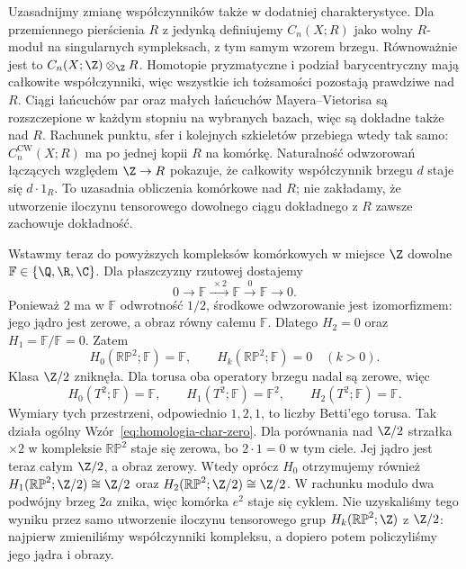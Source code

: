\begin{uwaga}
\label{rem:homologia-wspolczynniki-przestrzeni}
Uzasadnijmy zmianę współczynników także w dodatniej charakterystyce.
Dla przemiennego pierścienia $R$ z jedynką definiujemy $C_n(X;R)$
jako wolny $R$-moduł na singularnych sympleksach, z tym samym wzorem brzegu.
Równoważnie jest to $C_n(X;\Z)\otimes_{\Z}R$.
Homotopie pryzmatyczne i podział barycentryczny mają całkowite współczynniki,
więc wszystkie ich tożsamości pozostają prawdziwe nad $R$.
Ciągi łańcuchów par oraz małych łańcuchów Mayera--Vietorisa są
rozszczepione w każdym stopniu na wybranych bazach, więc są dokładne także nad $R$.
Rachunek punktu, sfer i kolejnych szkieletów przebiega wtedy tak samo:
$C_n^{\mathrm{CW}}(X;R)$ ma po jednej kopii $R$ na komórkę.
Naturalność odwzorowań łączących względem $\Z\to R$ pokazuje,
że całkowity współczynnik brzegu $d$ staje się $d\cdot1_R$.
To uzasadnia obliczenia komórkowe nad $R$; nie zakładamy,
że utworzenie iloczynu tensorowego dowolnego ciągu dokładnego
z $R$ zawsze zachowuje dokładność.
\end{uwaga}

\begin{przyklad}
\label{prz:zmiana-wspolczynnikow-rp2-torus}
Wstawmy teraz do powyższych kompleksów komórkowych
w miejsce $\Z$ dowolne
$\mathbb F\in\{\Q,\R,\C\}$.
Dla płaszczyzny rzutowej dostajemy
\[
 0\longrightarrow\mathbb F
 \xrightarrow{\;\times2\;}\mathbb F
 \xrightarrow{\;0\;}\mathbb F
 \longrightarrow0.
\]
Ponieważ $2$ ma w $\mathbb F$ odwrotność
$1/2$, środkowe odwzorowanie jest
izomorfizmem: jego jądro jest zerowe, a obraz równy całemu
$\mathbb F$. Dlatego $H_2=0$ oraz $H_1=\mathbb F/\mathbb F=0$.
Zatem
\[
 H_0(\mathbb{RP}^2;\mathbb F)=\mathbb F,
 \qquad H_k(\mathbb{RP}^2;\mathbb F)=0\quad(k>0).
\]
Klasa $\Z/2$ zniknęła. Dla torusa oba
operatory brzegu nadal są zerowe, więc
\[
 H_0(T^2;\mathbb F)=\mathbb F,\qquad
 H_1(T^2;\mathbb F)=\mathbb F^2,\qquad
 H_2(T^2;\mathbb F)=\mathbb F.
\]
Wymiary tych przestrzeni, odpowiednio
$1,2,1$, to liczby Betti'ego torusa.
Tak działa ogólny
Wzór~\eqref{eq:homologia-char-zero}.
Dla porównania nad $\Z/2$ strzałka
$\times2$ w kompleksie $\mathbb{RP}^2$
staje się zerowa, bo $2\cdot1=0$ w tym ciele.
Jej jądro jest teraz całym $\Z/2$, a obraz zerowy.
Wtedy oprócz $H_0$
otrzymujemy również
$H_1(\mathbb{RP}^2;\Z/2)\cong\Z/2$
oraz $H_2(\mathbb{RP}^2;\Z/2)\cong\Z/2$.
W rachunku modulo dwa podwójny brzeg $2a$ znika,
więc komórka $e^2$ staje się cyklem.
Nie uzyskaliśmy tego wyniku przez samo utworzenie iloczynu tensorowego
grup $H_k(\mathbb{RP}^2;\Z)$ z $\Z/2$: najpierw zmieniliśmy współczynniki
kompleksu, a dopiero potem policzyliśmy jego jądra i obrazy.
\end{przyklad}


